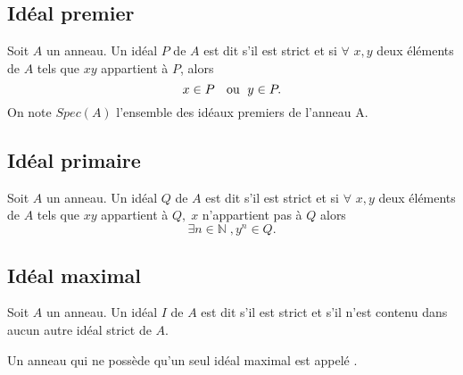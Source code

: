 \subsection{Idéal premier}
\begin{madefinition}
	Soit $A$ un anneau. Un idéal $P$ de $A$ est dit  s'il est strict et si $ \forall $  $x,y$ deux éléments de $A$ tels que $xy$ appartient à $P$, alors $$x \in P \text{ \; ou \;} y\in P.$$
	On note $Spec(A)$ l’ensemble des idéaux premiers de l'anneau A. 
\end{madefinition}
\subsection{Idéal primaire}
\begin{madefinition}
	Soit $A$ un anneau. Un idéal $Q$ de $A$ est dit  s'il est strict et si $ \forall $  $x,y$ deux éléments de $A$ tels que $xy$ appartient à $Q, \; x$ n'appartient pas à $Q $ alors $$\exists  n \in \mathbb{N} \;, y^{n} \in Q.$$
\end{madefinition}
\subsection{Idéal maximal}
\begin{madefinition}
	Soit $A$ un anneau. Un idéal $I$ de $A$ est dit  s'il est strict et s'il n'est contenu dans aucun autre idéal strict de $A$.
\end{madefinition}
\begin{maremarque}
	Un anneau qui ne possède qu'un seul idéal maximal est appelé .
\end{maremarque}
